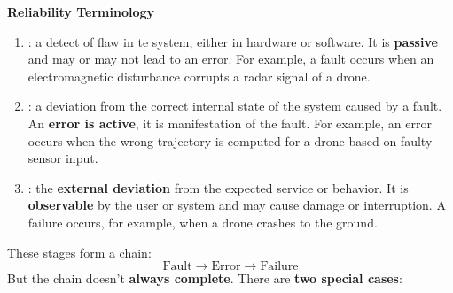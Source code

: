 \newpage

\begin{flushleft}
    \textcolor{Red2}{ \textbf{Reliability Terminology}}
\end{flushleft}
\begin{enumerate}
    \item {}: a detect of flaw in te system, either in hardware or software. It is \textbf{passive} and may or may not lead to an error. For example, a fault occurs when an electromagnetic disturbance corrupts a radar signal of a drone.
    \item {}: a deviation from the correct internal state of the system caused by a fault. An \textbf{error is active}, it is manifestation of the fault. For example, an error occurs when the wrong trajectory is computed for a drone based on faulty sensor input.
    \item {}: the \textbf{external deviation} from the expected service or behavior. It is \textbf{observable} by the user or system and may cause damage or interruption. A failure occurs, for example, when a drone crashes to the ground.
\end{enumerate}
These stages form a chain:
\begin{equation*}
    \text{Fault} \rightarrow \text{Error} \rightarrow \text{Failure}
\end{equation*}
But the chain doesn't \textbf{always complete}. There are \textbf{two special cases}:
